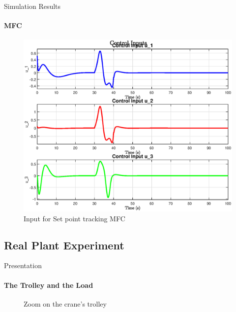 \begin{frame}{Simulation Results}
\framesubtitle{MFC}
    \begin{figure}
        \centering
        \includegraphics[width=0.8\linewidth]{imgs/Simulation/u_efficientMFC_Good_CI.eps}
        \caption{Input for Set point tracking MFC}
        \label{fig:input-mfc}
    \end{figure}
\end{frame}




    







\subsection{Real Plant Experiment}
\begin{frame}{Presentation}
\framesubtitle{The Trolley and the Load}

\begin{figure}
    \centering
    \caption{Zoom on the crane's trolley}
\end{figure}
\end{frame} 

